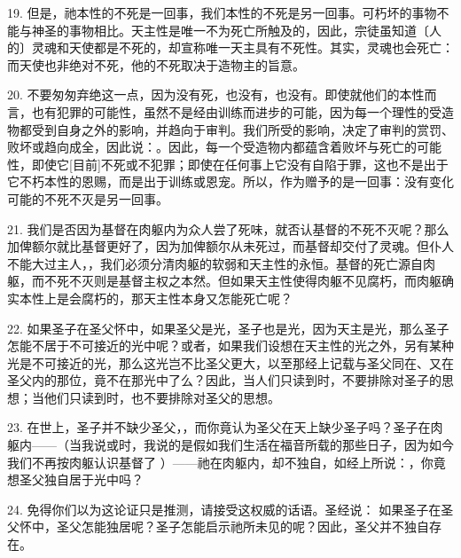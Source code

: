 19. 但是，祂本性的不死是一回事，我们本性的不死是另一回事。可朽坏的事物不能与神圣的事物相比。天主性是唯一不为死亡所触及的，因此，宗徒虽知道〔人的〕灵魂和天使都是不死的，却宣称唯一天主具有不死性。其实，灵魂也会死亡： 而天使也非绝对不死，他的不死取决于造物主的旨意。\par

20. 不要匆匆弃绝这一点，因为没有死，也没有，也没有。即使就他们的本性而言，也有犯罪的可能性，虽然不是经由训练而进步的可能，因为每一个理性的受造物都受到自身之外的影响，并趋向于审判。我们所受的影响，决定了审判的赏罚、败坏或趋向成全，因此说：。因此，每一个受造物内都蕴含着败坏与死亡的可能性，即使它[目前]不死或不犯罪；即使在任何事上它没有自陷于罪，这也不是出于它不朽本性的恩赐，而是出于训练或恩宠。所以，作为赠予的是一回事：没有变化可能的不死不灭是另一回事。\par

21. 我们是否因为基督在肉躯内为众人尝了死味，就否认基督的不死不灭呢？那么加俾额尔就比基督更好了，因为加俾额尔从未死过，而基督却交付了灵魂。但仆人不能大过主人，，我们必须分清肉躯的软弱和天主性的永恒。基督的死亡源自肉躯，而不死不灭则是基督主权之本然。但如果天主性使得肉躯不见腐朽，而肉躯确实本性上是会腐朽的，那天主性本身又怎能死亡呢？\par

22. 如果圣子在圣父怀中，如果圣父是光，圣子也是光，因为天主是光，那么圣子怎能不居于不可接近的光中呢？或者，如果我们设想在天主性的光之外，另有某种光是不可接近的光，那么这光岂不比圣父更大，以至那经上记载与圣父同在、又在圣父内的那位，竟不在那光中了么？因此，当人们只读到时，不要排除对圣子的思想；当他们只读到时，也不要排除对圣父的思想。\par

23. 在世上，圣子并不缺少圣父，，而你竟认为圣父在天上缺少圣子吗？圣子在肉躯内——（当我说或时，我说的是假如我们生活在福音所载的那些日子，因为如今我们不再按肉躯认识基督了 ）——祂在肉躯内，却不独自，如经上所说：，你竟想圣父独自居于光中吗？\par

24. 免得你们以为这论证只是推测，请接受这权威的话语。圣经说： 如果圣子在圣父怀中，圣父怎能独居呢？圣子怎能启示祂所未见的呢？因此，圣父并不独自存在。\par

